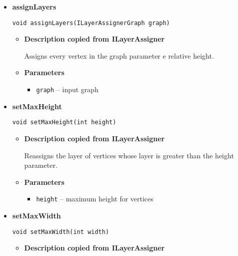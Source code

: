 {{{{{{{{{{{{{{{{{{{\begin{itemize}
{\begin{itemize}
{Defines a set of constraints which should be considered by the algorithm.
}
\item{
{\bf  Parameters}
  \begin{itemize}
   \item{
\texttt{constraints} -- relative layer constraints the algorithm should consider}
  \end{itemize}
}%
\end{itemize}
}%
\item{ 
{\bf  assignLayers}\\
\begin{lstlisting}[frame=none]
void assignLayers(ILayerAssignerGraph graph)\end{lstlisting} %
\begin{itemize}
\item{
{\bf  Description copied from ILayerAssigner{\small {}} }

Assigns every vertex in the graph parameter e relative height.
}
\item{
{\bf  Parameters}
  \begin{itemize}
   \item{
\texttt{graph} -- input graph}
  \end{itemize}
}%
\end{itemize}
}%
\item{ 
{\bf  setMaxHeight}\\
\begin{lstlisting}[frame=none]
void setMaxHeight(int height)\end{lstlisting} %
\begin{itemize}
\item{
{\bf  Description copied from ILayerAssigner{\small {}} }

Reassigns the layer of vertices whose layer is greater than the height parameter.
}
\item{
{\bf  Parameters}
  \begin{itemize}
   \item{
\texttt{height} -- maximum height for vertices}
  \end{itemize}
}%
\end{itemize}
}%
\item{ 
{\bf  setMaxWidth}\\
\begin{lstlisting}[frame=none]
void setMaxWidth(int width)\end{lstlisting} %
\begin{itemize}
\item{
{\bf  Description copied from ILayerAssigner{\small {}} }

}
\end{itemize}}
\end{itemize}}}}}}}}}}}}}}}}}}}}
